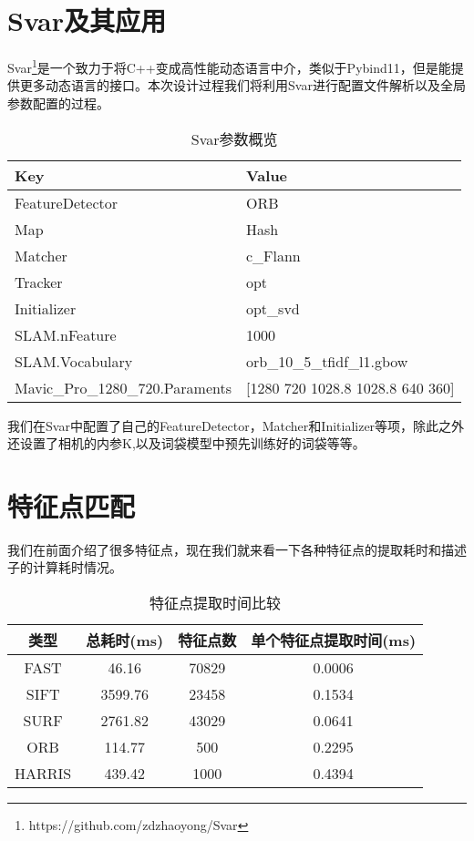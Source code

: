 \section{Svar及其应用}
Svar\footnote{https://github.com/zdzhaoyong/Svar}是一个致力于将C++变成高性能动态语言中介，类似于Pybind11，但是能提供更多动态语言的接口。本次设计过程我们将利用Svar进行配置文件解析以及全局参数配置的过程。\par
\begin{table}[]
	\centering
	\caption{Svar参数概览}
	\begin{tabular}{ll}
		\toprule
		\textbf{Key}                    & \textbf{Value}                       \\ \midrule
		FeatureDetector                 & ORB                                  \\ \hline
		Map                             & Hash                                 \\ \hline
		Matcher                         & c\_Flann                             \\ \hline
		Tracker            & opt              \\ \hline
		Initializer                      & opt\_svd  \\ \hline
		SLAM.nFeature                   & 1000                                 \\ \hline
		SLAM.Vocabulary                 & orb\_10\_5\_tfidf\_l1.gbow           \\ \hline
		Mavic\_Pro\_1280\_720.Paraments & {[}1280 720 1028.8 1028.8 640 360{]}                               \\ \bottomrule
	\end{tabular}
\end{table}
我们在Svar中配置了自己的FeatureDetector，Matcher和Initializer等项，除此之外还设置了相机的内参K,以及词袋模型中预先训练好的词袋等等。
\section{特征点匹配}
我们在前面介绍了很多特征点，现在我们就来看一下各种特征点的提取耗时和描述子的计算耗时情况。
\begin{table}[htbp]
	\centering
	\caption{特征点提取时间比较}
	\begin{tabular}{cccc}
		\toprule
		类型    & 总耗时(ms) & 特征点数  & 单个特征点提取时间(ms) \\ \midrule
		FAST   & 46.16   & 70829 & 0.0006        \\ \hline
		SIFT   & 3599.76 & 23458 & 0.1534        \\ \hline
		SURF   & 2761.82 & 43029 & 0.0641        \\ \hline
		ORB    & 114.77  & 500   & 0.2295        \\ \hline
		HARRIS & 439.42  & 1000  & 0.4394      	\\ \bottomrule
	\end{tabular}
\end{table}\par

